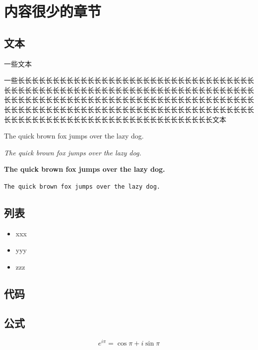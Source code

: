 \chapter{内容很少的章节}

\section{文本}

一些文本

一些长长长长长长长长长长长长长长长长长长长长长长长长长长长长长长长长长长长长长长长长长长长长长长长长长长长长长长长长长长长长长长长长长长长长长长长长长长长长长长长长长长长长长长长长长长长长长长长长长长长长长长长长长长长长长长长长长长长长长长长长长长长长长长长长长长长长长长长长长长长长长长长长长长长长长长长长长长长长长长长长长长长长长长长长长长长长文本

The quick brown fox jumps over the lazy dog.

\textit{The quick brown fox jumps over the lazy dog.}

\textbf{The quick brown fox jumps over the lazy dog.}

\texttt{The quick brown fox jumps over the lazy dog.}

\section{列表}

\begin{itemize}
	\item xxx
	\item yyy
	\item zzz
\end{itemize}

\section{代码}


\section{公式}

\[
    e^{i\pi}=\cos\pi+i\sin\pi
\]
